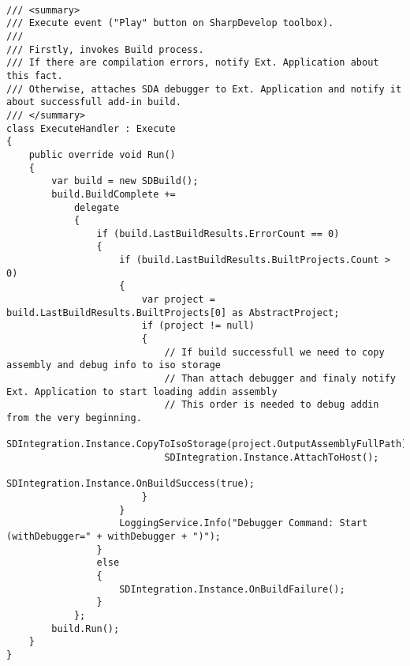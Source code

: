 \label{appendix:sd_custom_handler}
\setcounter{section}{100}

\begin{lstlisting}

/// <summary>
/// Execute event ("Play" button on SharpDevelop toolbox).
/// 
/// Firstly, invokes Build process. 
/// If there are compilation errors, notify Ext. Application about this fact.
/// Otherwise, attaches SDA debugger to Ext. Application and notify it about successfull add-in build.
/// </summary>
class ExecuteHandler : Execute
{
	public override void Run()
	{
		var build = new SDBuild();
		build.BuildComplete += 
			delegate
			{
				if (build.LastBuildResults.ErrorCount == 0)
				{
					if (build.LastBuildResults.BuiltProjects.Count > 0)
					{
						var project = build.LastBuildResults.BuiltProjects[0] as AbstractProject;
						if (project != null)
						{
							// If build successfull we need to copy assembly and debug info to iso storage
							// Than attach debugger and finaly notify Ext. Application to start loading addin assembly
							// This order is needed to debug addin from the very beginning.
							SDIntegration.Instance.CopyToIsoStorage(project.OutputAssemblyFullPath);
							SDIntegration.Instance.AttachToHost();
							SDIntegration.Instance.OnBuildSuccess(true);
						}
					}
					LoggingService.Info("Debugger Command: Start (withDebugger=" + withDebugger + ")");
				}
				else
				{
					SDIntegration.Instance.OnBuildFailure();
				}
			};
		build.Run();
	}
}

\end{lstlisting}